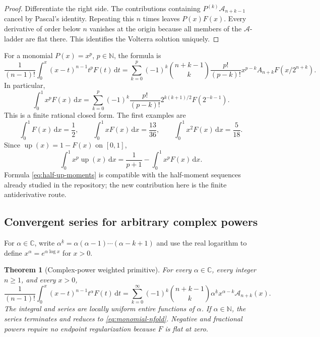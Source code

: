 \documentclass[11pt]{article}
\newtheorem{theorem}{Theorem}[section]
\theoremstyle{definition}
\theoremstyle{remark}
\DeclareMathOperator{\upf}{up}
\newcommand{\C}{\mathbb C}
\newcommand{\N}{\mathbb N}
\newcommand{\dd}{\,\mathrm d}
\newcommand{\fall}[2]{#1^{\underline{#2}}}
\begin{document}
\begin{proof}
Differentiate the right side.  The contributions containing \(P^{(k)}\mathcal
A_{n+k-1}\) cancel by Pascal's identity.  Repeating this \(n\) times leaves
\(P(x)F(x)\).  Every derivative of order below \(n\) vanishes at the origin because all
members of the \(\mathcal A\)-ladder are flat there.  This identifies the Volterra
solution uniquely.
\end{proof}

For a monomial \(P(x)=x^p\), \(p\in\N\), the formula is
\begin{equation}
 \frac1{(n-1)!}\int_0^x(x-t)^{n-1}t^pF(t)\dd t
 =\sum_{k=0}^{p}(-1)^k\binom{n+k-1}{k}
   \frac{p!}{(p-k)!}x^{p-k}A_{n+k}F(x/2^{n+k}).            \label{eq:monomial-nfold}
\end{equation}
In particular,
\begin{equation}
 \int_0^1x^pF(x)\dd x
 =\sum_{k=0}^{p}(-1)^k\frac{p!}{(p-k)!}
   2^{k(k+1)/2}F(2^{-k-1}).                               \label{eq:integer-moment-F}
\end{equation}
This is a finite rational closed form.  The first examples are
\begin{equation}
 \int_0^1F(x)\dd x=\frac12,\qquad
 \int_0^1xF(x)\dd x=\frac{13}{36},\qquad
 \int_0^1x^2F(x)\dd x=\frac5{18}.                        \label{eq:first-F-moments}
\end{equation}
Since \(\upf(x)=1-F(x)\) on \([0,1]\),
\begin{equation}
 \int_0^1x^p\upf(x)\dd x
 =\frac1{p+1}-\int_0^1x^pF(x)\dd x.                      \label{eq:half-up-moments}
\end{equation}
Formula \eqref{eq:half-up-moments} is compatible with the half-moment sequences already
studied in the repository; the new contribution here is the finite antiderivative route.

\subsection{Convergent series for arbitrary complex powers}

For \(\alpha\in\C\), write
\(
 \fall{\alpha}{k}=\alpha(\alpha-1)\cdots(\alpha-k+1)
\)
and use the real logarithm to define \(x^\alpha=e^{\alpha\log x}\) for \(x>0\).

\begin{theorem}[Complex-power weighted primitive]
\label{thm:complex-power}
For every \(\alpha\in\C\), every integer \(n\ge1\), and every \(x>0\),
\begin{equation}
 \boxed{
 \frac1{(n-1)!}\int_0^x(x-t)^{n-1}t^\alpha F(t)\dd t
 =\sum_{k=0}^{\infty}(-1)^k\binom{n+k-1}{k}
   \fall{\alpha}{k}x^{\alpha-k}\mathcal A_{n+k}(x).
 }                                                        \label{eq:complex-power-series}
\end{equation}
The integral and series are locally uniform entire functions of \(\alpha\).  If
\(\alpha\in\N\), the series terminates and reduces to
\eqref{eq:monomial-nfold}.  Negative and fractional powers require no endpoint
regularization because \(F\) is flat at zero.
\end{theorem}
\end{document}
